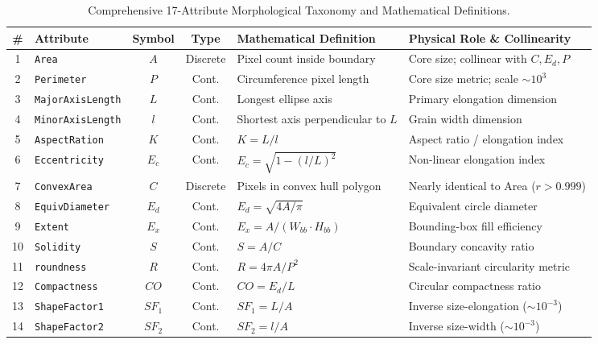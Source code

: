 \documentclass[11pt,a4paper]{article}
\begin{document}
\begin{table}[htbp]
    \centering
    \footnotesize
    \caption{Comprehensive 17-Attribute Morphological Taxonomy and Mathematical Definitions.}
    \label{tab:attributes}
    \setlength{\tabcolsep}{3.5pt}
    \begin{tabularx}{\linewidth}{@{} c l c c >{\raggedright\arraybackslash}p{3.8cm} >{\raggedright\arraybackslash}X @{}}
        \toprule
        \textbf{\#} & \textbf{Attribute} & \textbf{Symbol} & \textbf{Type} & \textbf{Mathematical Definition} & \textbf{Physical Role \& Collinearity} \\
        \midrule
        1 & \texttt{Area} & $A$ & Discrete & Pixel count inside boundary & Core size; collinear with $C, E_d, P$ \\
        2 & \texttt{Perimeter} & $P$ & Cont. & Circumference pixel length & Core size metric; scale $\sim 10^3$ \\
        3 & \texttt{MajorAxisLength} & $L$ & Cont. & Longest ellipse axis & Primary elongation dimension \\
        4 & \texttt{MinorAxisLength} & $l$ & Cont. & Shortest axis perpendicular to $L$ & Grain width dimension \\
        5 & \texttt{AspectRation} & $K$ & Cont. & $K = L / l$ & Aspect ratio / elongation index \\
        6 & \texttt{Eccentricity} & $E_c$ & Cont. & $E_c = \sqrt{1 - (l/L)^2}$ & Non-linear elongation index \\
        7 & \texttt{ConvexArea} & $C$ & Discrete & Pixels in convex hull polygon & Nearly identical to Area ($r > 0.999$) \\
        8 & \texttt{EquivDiameter} & $E_d$ & Cont. & $E_d = \sqrt{4A / \pi}$ & Equivalent circle diameter \\
        9 & \texttt{Extent} & $E_x$ & Cont. & $E_x = A / (W_{bb} \cdot H_{bb})$ & Bounding-box fill efficiency \\
        10 & \texttt{Solidity} & $S$ & Cont. & $S = A / C$ & Boundary concavity ratio \\
        11 & \texttt{roundness} & $R$ & Cont. & $R = 4\pi A / P^2$ & Scale-invariant circularity metric \\
        12 & \texttt{Compactness} & $CO$ & Cont. & $CO = E_d / L$ & Circular compactness ratio \\
        13 & \texttt{ShapeFactor1} & $SF_1$ & Cont. & $SF_1 = L / A$ & Inverse size-elongation ($\sim 10^{-3}$) \\
        14 & \texttt{ShapeFactor2} & $SF_2$ & Cont. & $SF_2 = l / A$ & Inverse size-width ($\sim 10^{-3}$) \\

\end{tabularx}
\end{table}
\end{document}
